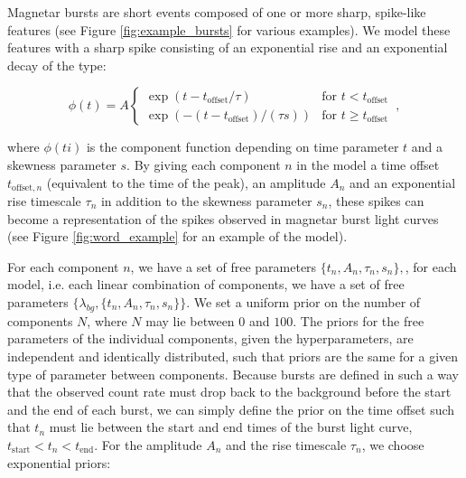\documentclass[12pt]{emulateapj}
\newcommand{\given}{\,|\,}
\newcommand{\dd}{\mathrm{d}}
\newcommand{\counts}{y}
\newcommand{\pars}{\theta}
\newcommand{\mean}{\lambda}
\newcommand{\Poisson}{{\mathcal P}}
\newcommand{\bg}{\mathrm{bg}}
\newcommand{\word}{\phi}
\begin{document}
Magnetar bursts are short events composed of one or more sharp, spike-like features (see Figure \ref{fig:example_bursts} for various examples). We model these features
with a sharp spike consisting of an exponential rise and an exponential decay of the type:


\begin{equation}
\word(t) = A \left\{\begin{array}{ll}\exp(t-t_{\mathrm{offset}}/\tau) & \mbox{for $t < t_{\mathrm{offset}}$}\\ 
\exp(-(t-t_{\mathrm{offset}})/(\tau s)) & \mbox{for $t \geq t_\mathrm{offset}$}\end{array}\right. \, ,
\label{eqn:word}
\end{equation}

where $\word(ti)$ is the component function depending on time parameter $t$ and a skewness
parameter $s$. By giving each component $n$ in the model a time offset $t_{\mathrm{offset},n}$ (equivalent to the time of the peak), 
an amplitude $A_n$ and an exponential rise timescale $\tau_n$ in addition to the skewness parameter $s_n$, 
these spikes can become a representation of the spikes observed in magnetar burst light curves (see Figure \ref{fig:word_example}
for an example of the model).

For each component $n$, we have a set of free parameters $\{t_n, A_n, \tau_n, s_n \},$, for each model, i.e. each
linear combination of components, we have a set of free parameters $\{\mean_{bg}, \{t_n, A_n, \tau_n, s_n\} \}$.
We set a uniform prior on the number of components $N$, where $N$ may lie between $0$ and $100$. 
The priors for the free parameters of the individual components, given the hyperparameters, are independent and identically distributed, such that priors 
are the same for a given type of parameter between components. 
Because bursts are defined in such a way that the observed count rate must drop back to the background before the
start and the end of each burst, we can simply define the prior on the time offset such that $t_n$ must lie between
the start and end times of the burst light curve, $t_{\mathrm{start}} < t_n < t_\mathrm{end}$. 
For the amplitude $A_n$ and the rise timescale $\tau_n$, we choose exponential priors:
\end{document}
